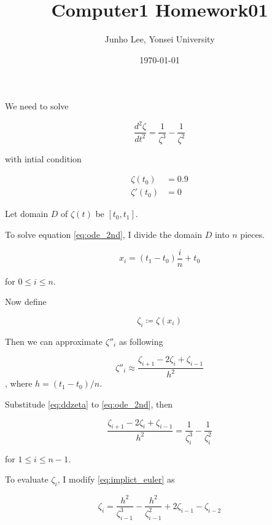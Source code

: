 \documentclass{article}
\title{Computer1 Homework01}
\author{Junho Lee, Yonsei University}
\date{\today}
\begin{document}
\maketitle

We need to solve

\begin{equation}
  \label{eq:ode_2nd}
  \frac{d^2 \zeta}{dt^2} = \frac{1}{\zeta^3} - \frac{1}{\zeta^2}
\end{equation}

with intial condition

\begin{equation}
  \label{eq:init_cond}
  \begin{aligned}
    \zeta(t_0) &= 0.9 \\
    \zeta'(t_0) &= 0
  \end{aligned}
\end{equation}

Let domain $D$ of $\zeta(t)$ be $[t_0, t_1]$.

To solve equation \eqref{eq:ode_2nd}, I divide the domain $D$ into $n$ pieces.

\begin{equation}
  \label{eq:x}
  x_i = (t_1-t_0)\frac{i}{n} + t_0
\end{equation}

for $0 \leq i \leq n$.

Now define

\begin{equation}
  \label{eq:zeta}
  \zeta_i \coloneqq \zeta(x_i)
\end{equation}

Then we can approximate $\zeta''_i$ as following

\begin{equation}
  \label{eq:ddzeta}
  \zeta''_i \approx \frac{\zeta_{i+1}-2\zeta_i+\zeta_{i-1}}{h^2}
\end{equation}
, where $h=(t_1-t_0)/n$.

Substitude \eqref{eq:ddzeta} to \eqref{eq:ode_2nd}, then

\begin{equation}
  \label{eq:implict_euler}
  \frac{\zeta_{i+1}-2\zeta_i+\zeta_{i-1}}{h^2} = \frac{1}{\zeta_i^3} - \frac{1}{\zeta_i^2}
\end{equation}

for $1 \leq i \leq n-1$.

To evaluate $\zeta_i$, I modify \eqref{eq:implict_euler} as

\begin{equation}
  \label{eq:explict_euler}
  \zeta_i = \frac{h^2}{\zeta_{i-1}^3} - \frac{h^2}{\zeta_{i-1}^2} + 2\zeta_{i-1} - \zeta_{i-2}
\end{equation}
\end{document}

